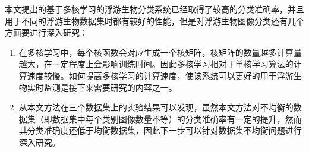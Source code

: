 本文提出的基于多核学习的浮游生物分类系统已经取得了较高的分类准确率，并且用于不同的浮游生物数据集时都有较好的性能，但是对浮游生物图像分类还有几个方面要进行深入研究：
\begin{enumerate}
\item 在多核学习中，每个核函数会对应生成一个核矩阵，核矩阵的数量越多计算量越大，在一定程度上会影响训练时间。因此多核学习相对于单核学习算法的计算速度较慢。如何提高多核学习的计算速度，使该系统可以更好的用于浮游生物实时监测是接下来需要研究的内容之一。
\item 从本文方法在三个数据集上的实验结果可以发现，虽然本文方法对不均衡的数据集（即数据集中每个类别图像数量不等）的分类准确率有一定的提升，然而其分类准确度还低于均衡数据集，因此下一步可以针对数据集不均衡问题进行深入研究。
\end{enumerate}